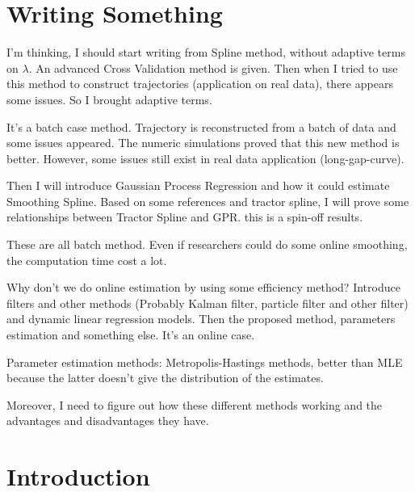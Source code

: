\section*{Writing Something}

I'm thinking, I should start writing from Spline method, without adaptive terms on $\lambda$. An advanced Cross Validation method is given. Then when I tried to use this method to construct trajectories (application on real data), there appears some issues. So I brought adaptive terms. 

It's a batch case method. Trajectory is reconstructed from a batch of data and some issues appeared. The numeric simulations proved that this new method is better. However, some issues still exist in real data application (long-gap-curve).

Then I will introduce Gaussian Process Regression and how it could estimate Smoothing Spline. Based on some references and tractor spline, I will prove some relationships between Tractor Spline and GPR. this is a spin-off results.

These are all batch method. Even if researchers could do some online smoothing, the computation time cost a lot. 

Why don't we do online estimation by using some efficiency method? Introduce filters and other methods (Probably Kalman filter, particle filter and other filter) and dynamic linear regression models. Then the proposed method, parameters estimation and something else. It's an online case.

Parameter estimation methods: Metropolis-Hastings methods, better than MLE because the latter doesn't give the distribution of the estimates. 

Moreover, I need to figure out how these different methods working and the advantages and disadvantages they have.



\section{Introduction}

